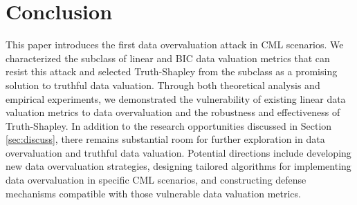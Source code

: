 \section{Conclusion}
This paper introduces the first data overvaluation attack in CML scenarios.
We characterized the subclass of linear and BIC data valuation metrics that can resist this attack and selected Truth-Shapley from the subclass as a promising solution to truthful data valuation. 
Through both theoretical analysis and empirical experiments, we demonstrated the vulnerability of existing linear data valuation metrics to data overvaluation and the robustness and effectiveness of Truth-Shapley. 
In addition to the research opportunities discussed in Section \ref{sec:discuss}, there remains substantial room for further exploration in data overvaluation and truthful data valuation.
Potential directions include developing new data overvaluation strategies, designing tailored algorithms for implementing data overvaluation in specific CML scenarios, and constructing defense mechanisms compatible with those vulnerable data valuation metrics.









